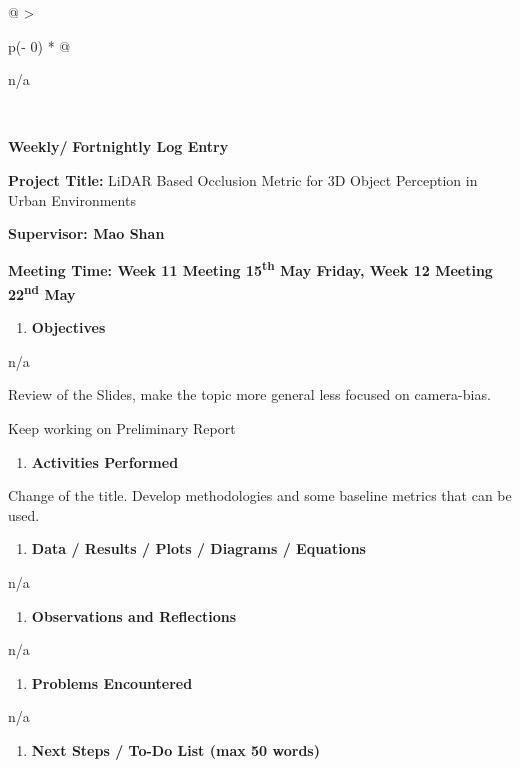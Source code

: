 \begin{longtable}[]{@{}
  >{\raggedright\arraybackslash}p{(\columnwidth - 0\tabcolsep) * }@{}}
\begin{minipage}[t]{\linewidth}
n/a
\end{minipage} \\
\begin{minipage}[t]{\linewidth}\raggedright
\textbf{Weekly/} \textbf{Fortnightly Log Entry}

\textbf{Project Title:} LiDAR Based Occlusion Metric for 3D Object
Perception in Urban Environments

\textbf{Supervisor: Mao Shan}

\textbf{Meeting Time: Week 11 Meeting 15\textsuperscript{th} May Friday,
Week 12 Meeting 22\textsuperscript{nd} May}

\begin{enumerate}
\def\labelenumi{\arabic{enumi}.}
\item
  \textbf{Objectives}
\end{enumerate}

n/a

Review of the Slides, make the topic more general less focused on
camera-bias.

Keep working on Preliminary Report

\begin{enumerate}
\def\labelenumi{\arabic{enumi}.}
\setcounter{enumi}{1}
\item
  \textbf{Activities Performed}
\end{enumerate}

Change of the title. Develop methodologies and some baseline metrics
that can be used.

\begin{enumerate}
\def\labelenumi{\arabic{enumi}.}
\setcounter{enumi}{2}
\item
  \textbf{Data / Results / Plots / Diagrams / Equations}
\end{enumerate}

n/a

\begin{enumerate}
\def\labelenumi{\arabic{enumi}.}
\setcounter{enumi}{3}
\item
  \textbf{Observations and Reflections}
\end{enumerate}

n/a

\begin{enumerate}
\def\labelenumi{\arabic{enumi}.}
\setcounter{enumi}{4}
\item
  \textbf{Problems Encountered}
\end{enumerate}

n/a

\begin{enumerate}
\def\labelenumi{\arabic{enumi}.}
\setcounter{enumi}{5}
\item
  \textbf{Next Steps / To-Do List (max 50 words)}
\end{enumerate}


\end{minipage}
\end{longtable}
